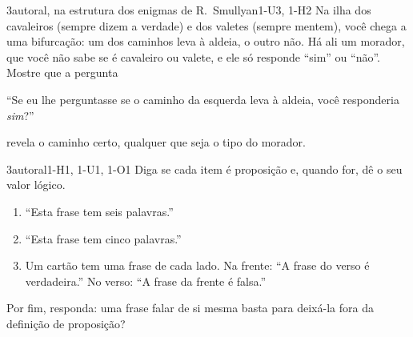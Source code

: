 \begin{questao}{3}{autoral, na estrutura dos enigmas de R.~Smullyan}{1-U3, 1-H2}\label{u1:q11}
Na ilha dos cavaleiros (sempre dizem a verdade) e dos valetes (sempre mentem), você chega a uma bifurcação: um dos caminhos leva à aldeia, o outro não. Há ali um morador, que você não sabe se é cavaleiro ou valete, e ele só responde \enquote{sim} ou \enquote{não}. Mostre que a pergunta
\begin{center}\enquote{Se eu lhe perguntasse se o caminho da esquerda leva à aldeia, você responderia \emph{sim}?}\end{center}
revela o caminho certo, qualquer que seja o tipo do morador.
\end{questao}

\begin{questao}{3}{autoral}{1-H1, 1-U1, 1-O1}\label{u1:q12}
Diga se cada item é proposição e, quando for, dê o seu valor lógico.
\begin{enumerate}[label=\alph*)]
  \item \enquote{Esta frase tem seis palavras.}
  \item \enquote{Esta frase tem cinco palavras.}
  \item Um cartão tem uma frase de cada lado. Na frente: \enquote{A frase do verso é verdadeira.} No verso: \enquote{A frase da frente é falsa.}
\end{enumerate}
Por fim, responda: uma frase falar de si mesma basta para deixá-la fora da definição de proposição?
\end{questao}

